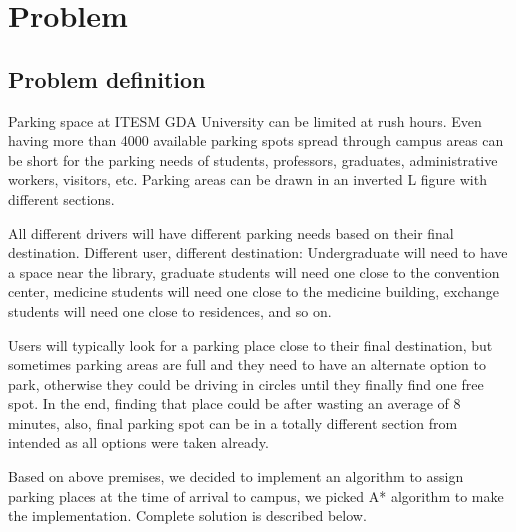 \chapter{Problem}

\section{Problem definition}
\setlength{\parskip}{1em}
Parking space at ITESM GDA University can be limited at rush hours. Even having more than 4000 available parking spots spread through campus areas can be short for the parking needs of students, professors, graduates, administrative workers, visitors, etc. Parking areas can be drawn in an inverted L figure with different sections.

All different drivers will have different parking needs based on their final destination. Different user, different destination: Undergraduate will need to have a space near the library, graduate students will need one close to the convention center, medicine students will need one close to the medicine building,  exchange students will need one close to residences, and so on. 

Users will typically look for a parking place close to their final destination, but sometimes parking areas are full and they need to have an alternate option to park, otherwise they could be driving in circles until they finally find one free spot. In the end, finding that place could be after wasting an average of 8 minutes, also, final parking spot can be in a totally different section from intended as all options were taken already.

Based on above premises, we decided to implement an algorithm to assign parking places at the time of arrival to campus, we picked A* algorithm to make the implementation. Complete solution is described below. 
